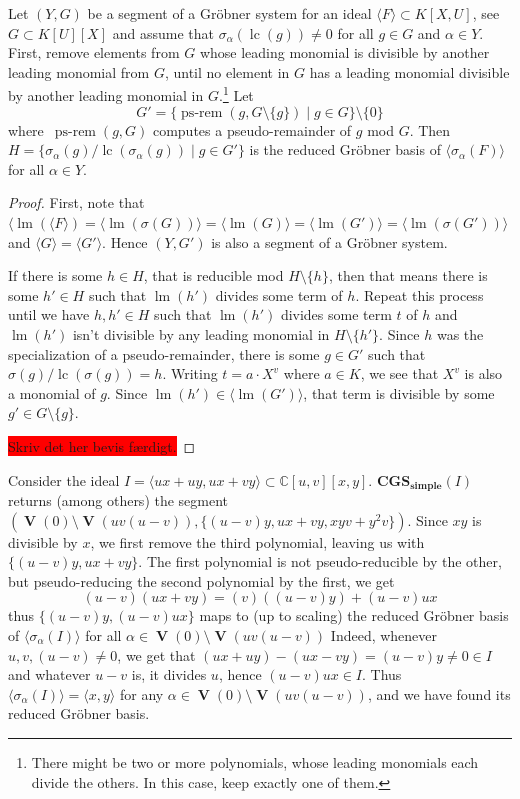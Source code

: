 \documentclass[a4paper, 12pt]{article}
\newcommand{\C}{\mathbb{C}}
\DeclareMathOperator{\LM}{lm}
\DeclareMathOperator{\LC}{lc}
\DeclareMathOperator{\V}{\mathbf V}
\theoremstyle{changedot}
\theoremstyle{changedotbreak}
\theoremstyle{nonumberplain}
\newtheorem{proof}{Proof}
\begin{document}
\begin{theorem}
  Let $(Y, G)$ be a segment of a Gröbner system for an ideal $\langle F \rangle \subset K[X, U]$, see $G \subset K[U][X]$ and assume that $\sigma_{\alpha}(\LC(g)) \neq 0$ for all $g \in G$ and $\alpha \in Y$. First, remove elements from $G$ whose leading monomial is divisible by another leading monomial from $G$, until no element in $G$ has a leading monomial divisible by another leading monomial in $G$.\footnote{There might be two or more polynomials, whose leading monomials each divide the others. In this case, keep exactly one of them.} Let
  \[G' = \{\operatorname{ps-rem}(g, G \setminus \{g\}) \mid g \in G\} \setminus \{0\}\]
  where $\,\operatorname{ps-rem}(g, G)$ computes a pseudo-remainder of $g$ mod $G$.
  Then $H = \{\sigma_{\alpha}(g)/\LC(\sigma_{\alpha}(g)) \mid g \in G'\}$ is the reduced Gröbner basis of $\langle \sigma_{\alpha}(F) \rangle$ for all $\alpha \in Y$.
\end{theorem}
\begin{proof}
  First, note that $\langle \LM(\langle F \rangle) = \langle \LM(\sigma(G)) \rangle = \langle \LM(G) \rangle = \langle \LM(G') \rangle = \langle \LM(\sigma(G')) \rangle$ and $\langle G \rangle = \langle G' \rangle$. Hence $(Y, G')$ is also a segment of a Gröbner system.

  If there is some $h \in H$, that is reducible mod $H \setminus \{h\}$, then that means there is some $h' \in H$ such that $\LM(h')$ divides some term of $h$. Repeat this process until we have $h, h' \in H$ such that $\LM(h')$ divides some term $t$ of $h$ and $\LM(h')$ isn't divisible by any leading monomial in $H \setminus \{h'\}$. Since $h$ was the specialization of a pseudo-remainder, there is some $g \in G'$ such that $\sigma(g)/\LC(\sigma(g)) = h$. Writing $t = a\cdot X^{v}$ where $a \in K$, we see that $X^{v}$ is also a monomial of $g$. Since $\LM(h') \in \langle \LM(G') \rangle$, that term is divisible by some $g' \in G \setminus \{g\}$.

  \colorbox{red}{Skriv det her bevis færdigt.}
\end{proof}

\begin{example}\upshape
  Consider the ideal $I = \langle ux + uy, ux + vy\rangle \subset \C[u, v][x, y]$. $\mathbf{CGS_{simple}}(I)$ returns (among others) the segment $(\V(0) \setminus \V(uv(u - v)), \{(u - v)y, ux + vy, xyv + y^{2}v\})$. Since $xy$ is divisible by $x$, we first remove the third polynomial, leaving us with $\{(u - v)y, ux + vy\}$. The first polynomial is not pseudo-reducible by the other, but pseudo-reducing the second polynomial by the first, we get
  \[(u - v)(ux + vy) = (v)((u - v)y) + (u - v)ux\]
  thus $\{(u - v)y, (u - v)ux\}$ maps to (up to scaling) the reduced Gröbner basis of $\langle \sigma_{\alpha}(I) \rangle$ for all $\alpha \in \V(0) \setminus \V(uv(u - v))$ Indeed, whenever $u, v, (u - v) \neq 0$, we get that $(ux + uy) - (ux - vy) = (u - v)y \neq 0 \in I$ and whatever $u - v$ is, it divides $u$, hence $(u - v)ux \in I$. Thus $\langle \sigma_{\alpha}(I) \rangle = \langle x, y \rangle$ for any $\alpha \in \V(0) \setminus \V(uv(u - v))$, and we have found its reduced Gröbner basis.
\end{example}
\end{document}
